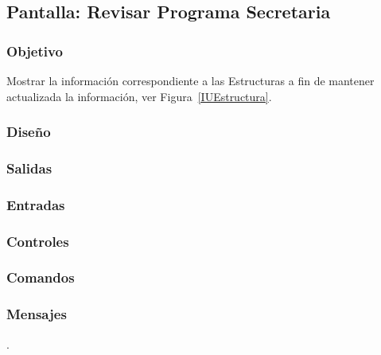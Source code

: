 \subsection{Pantalla: Revisar Programa Secretaria}

\subsubsection{Objetivo}
Mostrar la información correspondiente a las Estructuras a fin de mantener actualizada la información, ver Figura~\ref{IUEstructura}. 

\subsubsection{Diseño}

\subsubsection{Salidas}


\subsubsection{Entradas}

\subsubsection{Controles}


\subsubsection{Comandos}


\subsubsection{Mensajes}

.

